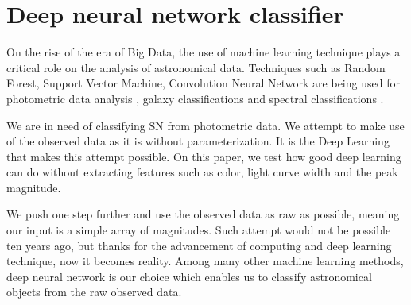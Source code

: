 \documentclass[useamsfonts]{pasj01}
\begin{document}
\section{Deep neural network classifier}
\label{sec:DNN}
On the rise of the era of Big Data, the use of machine learning technique plays a critical role on the analysis of astronomical data.  Techniques such as Random Forest, Support Vector Machine, Convolution Neural Network are being used for photometric data analysis \citep{pasquet19a}, galaxy classifications \citep{hausen19a} and spectral 
classifications \citep{garciadias18a,muthukrishna19c,sharma20a}.

We are in need of classifying SN from photometric data.
We attempt to make use of the observed data as it is without parameterization.
It is the Deep Learning that makes this attempt possible.
On this paper, we test how good deep learning can do without extracting features such as color, light curve width and the peak magnitude.

We push one step further and use the observed data as raw as possible, meaning our input is a simple array of magnitudes.  Such attempt would not be possible ten years ago, but thanks for the advancement of computing and deep learning technique, now it becomes reality.  Among many other machine learning methods, deep neural network is our choice which enables us to classify astronomical objects from the raw observed data. 
\end{document}
